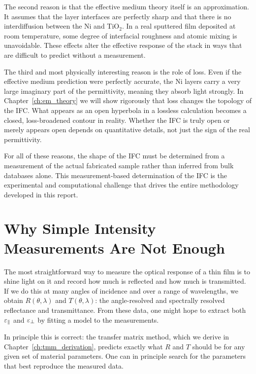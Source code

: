 The second reason is that the effective medium theory itself is an
approximation. It assumes that the layer interfaces are perfectly sharp and
that there is no interdiffusion between the Ni and TiO$_2$. In a real
sputtered film deposited at room temperature, some degree of interfacial
roughness and atomic mixing is unavoidable. These effects alter the effective
response of the stack in ways that are difficult to predict without a
measurement.

The third and most physically interesting reason is the role of loss. Even if
the effective medium prediction were perfectly accurate, the Ni layers carry a
very large imaginary part of the permittivity, meaning they absorb light
strongly. In Chapter~\ref{ch:em_theory} we will show rigorously that loss
changes the topology of the IFC. What appears as an open hyperbola in a
lossless calculation becomes a closed, loss-broadened contour in reality.
Whether the IFC is truly open or merely appears open depends on quantitative
details, not just the sign of the real permittivity.

For all of these reasons, the shape of the IFC must be determined from a
measurement of the actual fabricated sample rather than inferred from bulk
databases alone. This measurement-based determination of the IFC is the
experimental and computational challenge that drives the entire methodology
developed in this report.

\section{Why Simple Intensity Measurements Are Not Enough}

The most straightforward way to measure the optical response of a thin film is
to shine light on it and record how much is reflected and how much is
transmitted. If we do this at many angles of incidence and over a range of
wavelengths, we obtain $R(\theta, \lambda)$ and $T(\theta, \lambda)$: the
angle-resolved and spectrally resolved reflectance and transmittance. From
these data, one might hope to extract both $\varepsilon_{\parallel}$ and $\varepsilon_{\perp}$ by fitting a
model to the measurements.

In principle this is correct: the transfer matrix method, which we derive in
Chapter~\ref{ch:tmm_derivation}, predicts exactly what $R$ and $T$ should be
for any given set of material parameters. One can in principle search for the
parameters that best reproduce the measured data.

